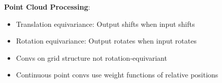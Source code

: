\documentclass{article}
\begin{document}
\begin{multicols}{3}
\textbf{Point Cloud Processing}:
\begin{itemize}
\item Translation equivariance: Output shifts when input shifts
\item Rotation equivariance: Output rotates when input rotates 
\item Convs on grid structure not rotation-equivariant
\item Continuous point convs use weight functions of relative positions
\end{itemize}

\end{multicols}
\end{document}
